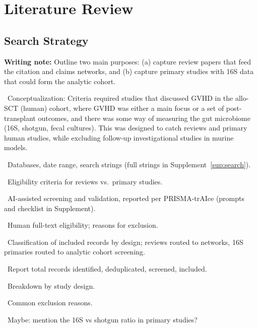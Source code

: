 \documentclass[11pt,a4paper]{article}
\newcommand{\todoitem}[1]{\par\noindent\textcolor{blue!70!black}{\textbullet~#1}}
\newcommand{\writingnote}[1]{\par\medskip\noindent\colorbox{yellow!30}{\parbox{\dimexpr\linewidth-2\fboxsep}{%
  \small\textbf{Writing note:} #1}}\par\medskip}
\begin{document}
\section{Literature Review}
\label{sec:litreview}

\subsection{Search Strategy}
\label{sec:search}
\writingnote{Outline two main purposes: (a) capture review papers that feed the citation and claims networks, and (b) capture primary studies with 16S data that could form the analytic cohort.}
\todoitem{Conceptualization: Criteria required studies that discussed GVHD in the allo-SCT (human) cohort, where GVHD was either a main focus or a set of post-transplant outcomes, and there was some way of measuring the gut microbiome (16S, shotgun, fecal cultures). This was designed to catch reviews and primary human studies, while excluding follow-up investigational studies in murine models.}
\todoitem{Databases, date range, search strings (full strings in Supplement~\ref{sup:search}).}
\todoitem{Eligibility criteria for reviews vs.\ primary studies.}
\todoitem{AI-assisted screening and validation, reported per PRISMA-trAIce (prompts and checklist in Supplement).}
\todoitem{Human full-text eligibility; reasons for exclusion.}
\todoitem{Classification of included records by design; reviews routed to networks, 16S primaries routed to analytic cohort screening.}
\todoitem{Report total records identified, deduplicated, screened, included.}
\todoitem{Breakdown by study design.}
\todoitem{Common exclusion reasons.}
\todoitem{Maybe: mention the 16S vs shotgun ratio in primary studies?}
\end{document}
